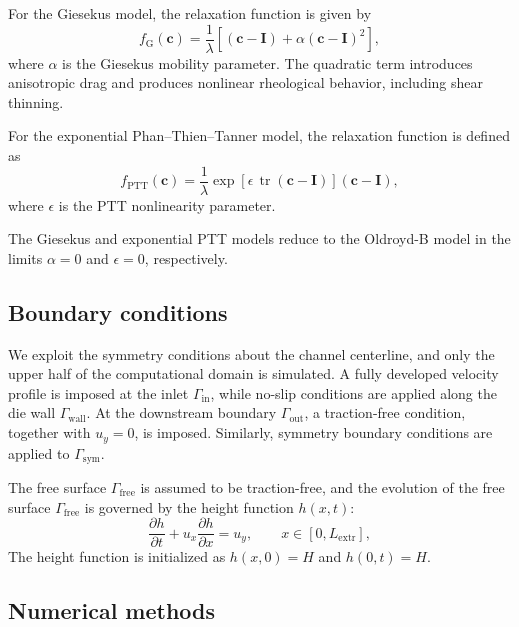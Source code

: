 \documentclass{elsarticle}
\newcommand{\ten}[1]{\boldsymbol{#1}}
\begin{document}
For the Giesekus model, the relaxation function is given by
\begin{equation}
f_{\mathrm{G}}(\ten{c})
=
\frac{1}{\lambda}
\left[
\left(\ten{c}-\ten{I}\right)
+
\alpha
\left(\ten{c}-\ten{I}\right)^2
\right],
\label{eq:giesekus_model}
\end{equation}
where $\alpha$ is the Giesekus mobility parameter. The quadratic term
introduces anisotropic drag and produces nonlinear rheological behavior,
including shear thinning.

For the exponential Phan--Thien--Tanner model, the relaxation function is
defined as
\begin{equation}
f_{\mathrm{PTT}}(\ten{c})
=
\frac{1}{\lambda}
\exp\left[
\epsilon\,
\operatorname{tr}
\left(
\ten{c}-\ten{I}
\right)
\right]
\left(
\ten{c}-\ten{I}
\right),
\label{eq:exponential_ptt_model}
\end{equation}
where $\epsilon$ is the PTT nonlinearity parameter.

The Giesekus and exponential PTT models reduce to the Oldroyd-B
model in the limits $\alpha=0$ and $\epsilon=0$, respectively.


\subsection{Boundary conditions}

We exploit the symmetry conditions about the channel centerline, and only the upper half of the computational domain is simulated. A fully developed velocity profile is imposed at the inlet $\Gamma_{\mathrm{in}}$, while no-slip conditions are applied along the die wall $\Gamma_{\mathrm{wall}}$. At the downstream boundary $\Gamma_{\mathrm{out}}$, a traction-free condition, together with $u_y=0$, is imposed. Similarly, symmetry boundary conditions are applied to $\Gamma_{\mathrm{sym}}$.

The free surface $\Gamma_{\mathrm{free}}$ is assumed to be traction-free, and the evolution of the free surface $\Gamma_{\mathrm{free}}$ is governed by the height function $h(x,t)$:
\begin{equation}
\frac{\partial h}{\partial t}
+
u_x \frac{\partial h}{\partial x}
=
u_y,
\qquad
x \in [0,L_{\mathrm{extr}}],
\label{eq:height_2d}
\end{equation}
The height function is initialized as $h(x,0)=H$ and  $h(0,t)=H$.


\subsection{Numerical methods}
\end{document}
